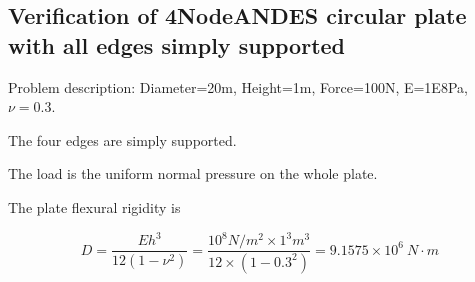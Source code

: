 \documentclass[fleqn,11pt,letter]{article}
\begin{document}






















\newpage
\subsection{Verification of 4NodeANDES circular plate with all edges simply supported}


Problem description: Diameter=20m, Height=1m, Force=100N, E=1E8Pa, $\nu=0.3$. 

The four edges are simply supported. 

The load is the uniform normal pressure on the whole plate. 


The plate flexural rigidity is 

\begin{equation}
  D=\frac{Eh^3}{12(1-\nu^2)}=\frac{10^8 N/m^2 \times 1^3 m^3 }{12 \times (1-0.3^2) }= 9.1575 \times 10^6 \ N\cdot m
\end{equation}
\end{document}
